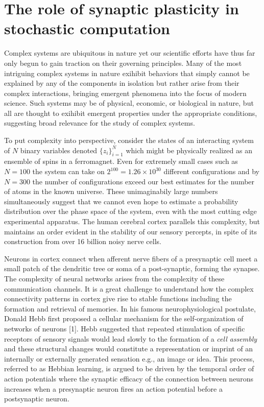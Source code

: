 \documentclass{ucetd}
\begin{document}
\section{The role of synaptic plasticity in stochastic computation}

Complex systems are ubiquitous in nature yet our scientific efforts have thus far only begun to gain traction on their governing principles. Many of the most intriguing complex systems in nature exihibit behaviors that simply cannot be explained by any of the components in isolation but rather arise from their complex interactions, bringing emergent phenomena into the focus of modern science. Such systems may be of physical, economic, or biological in nature, but all are thought to exihibit emergent properties under the appropriate conditions, suggesting broad relevance for the study of complex systems. 

To put complexity into perspective, consider the states of an interacting system of $N$ binary variables denoted $\{z_{i}\}_{i=1}^{N}$ which might be physically realized as an ensemble of spins in a ferromagnet. Even for extremely small cases such as $N=100$ the system can take on $2^{100} = 1.26\times 10^{30}$ different configurations and by $N=300$ the number of configurations exceed our best estimates for the number of atoms in the known universe. These unimaginabily large numbers simultaneously suggest that we cannot even hope to estimate a probability distribution over the phase space of the system, even with the most cutting edge experimental apparatus. The human cerebral cortex parallels this complexity, but maintains an order evident in the stability of our sensory percepts, in spite of its construction from over 16 billion noisy nerve cells. 

Neurons in cortex connect when afferent nerve fibers of a presynaptic cell meet a small patch of the dendritic tree or soma of a post-synaptic, forming the synapse. The complexity of neural networks arises from the complexity of these communication channels. It is a great challenge to understand how the complex connectivity patterns in cortex give rise to stable functions including the formation and retrieval of memories. In his famous neurophysiological postulate, Donald Hebb first proposed a cellular mechanism for the self-organization of networks of neurons [1]. Hebb suggested that repeated stimulation of specific receptors of sensory signals would lead slowly to the formation of a \emph{cell assembly} and these structural changes would constitute a representation or imprint of an internally or externally generated sensation e.g., an image or idea. This process, referred to as Hebbian learning, is argued to be driven by the temporal order of action potentials where the synaptic efficacy of the connection between neurons increases when a presynaptic neuron fires an action potential before a postsynaptic neuron.
\end{document}
